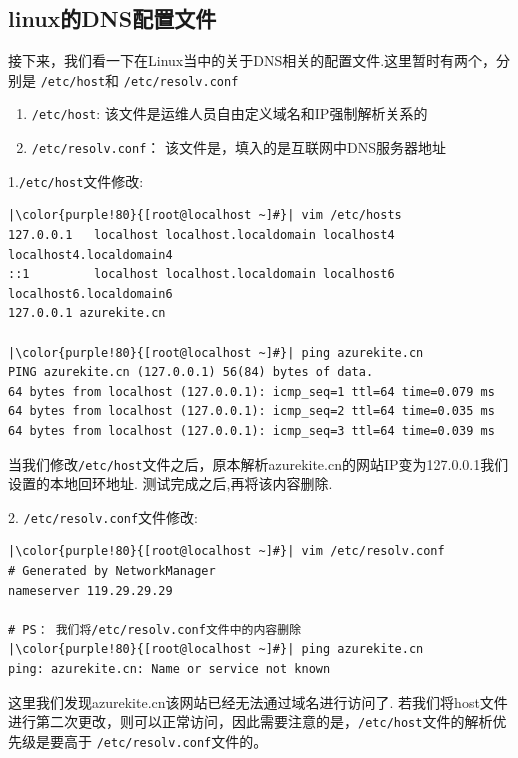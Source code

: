 \subsection{linux的DNS配置文件}
接下来，我们看一下在Linux当中的关于DNS相关的配置文件.这里暂时有两个，分别是
\texttt{/etc/host}和 \texttt{/etc/resolv.conf}
\begin{enumerate}
\item \texttt{/etc/host}: 该文件是运维人员自由定义域名和IP强制解析关系的
\item \texttt{/etc/resolv.conf}： 该文件是，填入的是互联网中DNS服务器地址
\end{enumerate}
\begin{ascboxB}{1.\texttt{/etc/host}文件修改:}
\begin{verbatim}
|\color{purple!80}{[root@localhost ~]#}| vim /etc/hosts
127.0.0.1   localhost localhost.localdomain localhost4 localhost4.localdomain4
::1         localhost localhost.localdomain localhost6 localhost6.localdomain6
127.0.0.1 azurekite.cn

|\color{purple!80}{[root@localhost ~]#}| ping azurekite.cn
PING azurekite.cn (127.0.0.1) 56(84) bytes of data.
64 bytes from localhost (127.0.0.1): icmp_seq=1 ttl=64 time=0.079 ms
64 bytes from localhost (127.0.0.1): icmp_seq=2 ttl=64 time=0.035 ms
64 bytes from localhost (127.0.0.1): icmp_seq=3 ttl=64 time=0.039 ms
\end{verbatim}
当我们修改\texttt{/etc/host}文件之后，原本解析azurekite.cn的网站IP变为127.0.0.1我们设置的本地回环地址. 测试完成之后,再将该内容删除.
	\end{ascboxB}
	\begin{ascboxB}{2. \texttt{/etc/resolv.conf}文件修改:}
\begin{verbatim}
|\color{purple!80}{[root@localhost ~]#}| vim /etc/resolv.conf
# Generated by NetworkManager
nameserver 119.29.29.29

# PS： 我们将/etc/resolv.conf文件中的内容删除
|\color{purple!80}{[root@localhost ~]#}| ping azurekite.cn
ping: azurekite.cn: Name or service not known
\end{verbatim}

这里我们发现azurekite.cn该网站已经无法通过域名进行访问了. 若我们将host文件进行第二次更改，则可以正常访问，因此需要注意的是，\texttt{/etc/host}文件的解析优先级是要高于 \texttt{/etc/resolv.conf}文件的。
	\end{ascboxB}
\btrule{}

